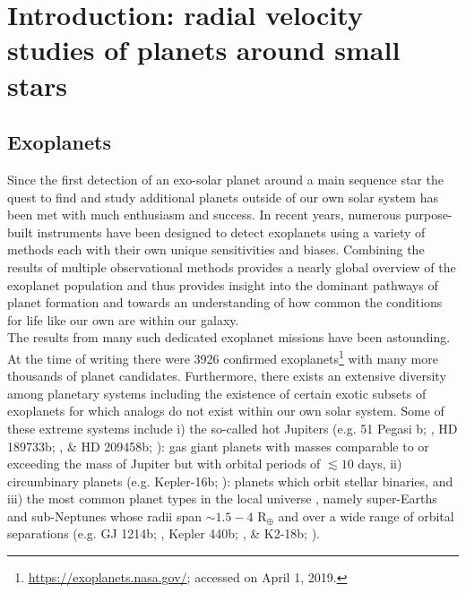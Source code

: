 \chapter[Introduction]{Introduction: radial velocity studies of planets around small stars}

\section{Exoplanets}  \label{sect:exoplanets}
Since the first detection of an exo-solar planet around a main sequence star 
\citep{mayor95}
the quest to find and study additional planets outside of our own solar system 
has been met with much enthusiasm and success. In recent years, numerous 
purpose-built instruments
have been designed to detect exoplanets using a variety of methods each with
their own unique sensitivities and biases. 
Combining the results of multiple observational methods provides a nearly global
overview of the exoplanet population and thus provides insight into
the dominant pathways of planet formation and towards an understanding of how
common the conditions for life like our own are within our galaxy. \\

The results from many such dedicated exoplanet missions have been 
astounding. At the time of writing there were 3926 confirmed 
exoplanets\footnote{\url{https://exoplanets.nasa.gov/}; accessed on April 1, 2019.} 
with many more thousands of planet candidates. Furthermore, there 
exists an extensive diversity among planetary systems including the existence 
of certain exotic subsets of exoplanets for which analogs do not exist within 
our own solar system. Some of these extreme systems include i) the so-called hot 
Jupiters (e.g. 51 Pegasi b; \citealt{mayor95}, HD 189733b; \citealt{bouchy05}, 
\& HD 209458b; \citealt{mazeh99, charbonneau00}): 
gas giant planets with masses comparable to or exceeding the mass of Jupiter  
but with orbital periods of $\lesssim 10$ days, ii) circumbinary planets (e.g. 
Kepler-16b; \citealt{doyle11}): 
planets which orbit stellar binaries, and iii) the most common planet types
in the local universe \citep{petigura13}, namely super-Earths and sub-Neptunes whose
radii span $\sim 1.5-4$ R$_{\oplus}$ and over a wide range of orbital separations
(e.g. GJ 1214b; \citealt{charbonneau09}, Kepler 440b; \citealt{torres15}, \&
K2-18b; \citealt{foremanmackey15a,montet15}).


